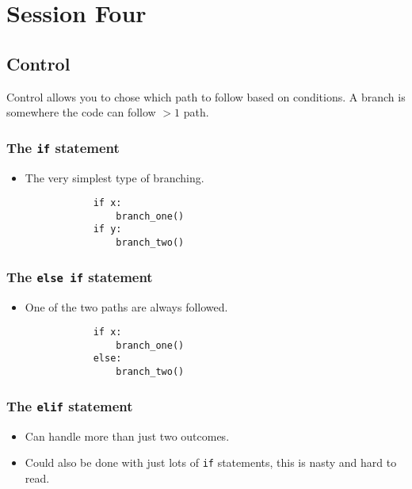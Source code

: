 \section{Session Four}\label{sec:session_four}

\subsection{Control}\label{sub:control}

Control allows you to chose which path to follow based on conditions.
A branch is somewhere the code can follow \(>1\) path.

\subsubsection{The \texttt{if} statement}\label{ssub:the-if-statement}

\begin{itemize}
    \item The very simplest type of branching.
        \begin{verbatim}
            if x:
                branch_one()
            if y:
                branch_two()
        \end{verbatim}
\end{itemize}

\subsubsection{The \texttt{else if} statement}\label{ssub:the-else-if-statement}

\begin{itemize}
    \item One of the two paths are always followed.
        \begin{verbatim}
            if x:
                branch_one()
            else:
                branch_two()
        \end{verbatim}
\end{itemize}

\subsubsection{The \texttt{elif} statement}\label{ssub:the-elif-statement}

\begin{itemize}
    \item Can handle more than just two outcomes.
    \item Could also be done with just lots of \texttt{if} statements, this is nasty and hard to read.
\end{itemize}

